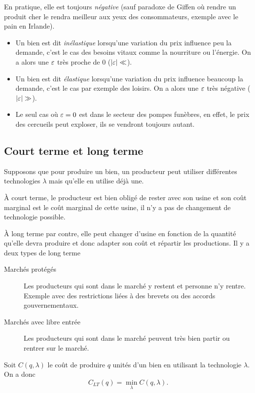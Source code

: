 En pratique, elle est toujours \emph{négative}
(sauf paradoxe de Giffen où rendre un produit cher le rendra meilleur aux yeux
des consommateurs, exemple avec le pain en Irlande).

\begin{itemize}
  \item Un bien est dit \emph{inélastique} lorsqu'une variation du prix
    influence peu la demande, c'est le cas des besoins vitaux comme la
    nourriture ou l'énergie. On a alors une $\varepsilon$ très proche de 0
    ($|\varepsilon| \ll$).
  \item Un bien est dit \emph{élastique} lorsqu'une variation du prix
    influence beaucoup la demande, c'est le cas par exemple des loisirs.
    On a alors une $\varepsilon$ très négative ($|\varepsilon| \gg$).
  \item Le seul cas où $\varepsilon = 0$ est dans le secteur des pompes
   funèbres, en effet, le prix des cercueils peut exploser,
   ils se vendront toujours autant.
\end{itemize}

\subsection{Court terme et long terme}
Supposons que pour produire un bien, un producteur peut utiliser
différentes technologies $\lambda$ mais qu'elle en utilise déjà une.

À court terme, le producteur est bien obligé de rester avec son usine
et son coût marginal est le coût marginal de cette usine, il n'y a pas
de changement de technologie possible.

À long terme par contre, elle peut changer d'usine en fonction de la quantité
qu'elle devra produire et donc adapter son coût et répartir les productions.
Il y a deux types de long terme
\begin{description}
  \item[Marchés protégés]
    Les producteurs qui sont dans le marché y restent et personne n'y rentre.
    Exemple avec des restrictions liées à des brevets ou des accords gouvernementaux.
  \item[Marchés avec libre entrée]
    Les producteurs qui sont dans le marché peuvent très bien partir ou rentrer sur le marché.
\end{description}

Soit $C(q,\lambda)$ le coût de produire $q$ unités d'un bien en utilisant
la technologie $\lambda$.
On a donc
\[ C_{LT}(q) = \min_\lambda C(q,\lambda). \]

